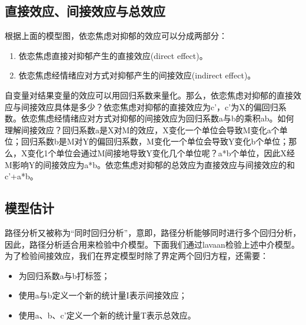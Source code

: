 \documentclass[
  chinese-hans,
  letterpaper,
  DIV=11,
  numbers=noendperiod]{scrartcl}
\providecommand{\tightlist}{%
  \setlength{\itemsep}{0pt}\setlength{\parskip}{0pt}}
\begin{document}
\subsection{直接效应、间接效应与总效应}\label{ux76f4ux63a5ux6548ux5e94ux95f4ux63a5ux6548ux5e94ux4e0eux603bux6548ux5e94}

根据上面的模型图，依恋焦虑对抑郁的效应可以分成两部分：

\begin{enumerate}
\def\labelenumi{\arabic{enumi}.}
\tightlist
\item
  依恋焦虑直接对抑郁产生的直接效应(direct effect)。
\item
  依恋焦虑经情绪应对方式对抑郁产生的间接效应(indirect effect)。
\end{enumerate}

自变量对结果变量的效应可以用回归系数来量化。那么，依恋焦虑对抑郁的直接效应与间接效应具体是多少？依恋焦虑对抑郁的直接效应为c'，c'为X的偏回归系数。依恋焦虑经情绪应对方式对抑郁的间接效应为回归系数a与b的乘积ab。如何理解间接效应？回归系数a是X对M的效应，X变化一个单位会导致M变化a个单位；回归系数b是M对Y的偏回归系数，M变化一个单位会导致Y变化b个单位；那么，X变化1个单位会通过M间接地导致Y变化几个单位呢？a*b个单位，因此X经M影响Y的间接效应为a*b。依恋焦虑对抑郁的总效应为直接效应与间接效应的和c'+a*b。

\subsection{模型估计}\label{ux6a21ux578bux4f30ux8ba1-1}

路径分析又被称为``同时回归分析''，意即，路径分析能够同时进行多个回归分析，因此，路径分析适合用来检验中介模型。下面我们通过lavaan检验上述中介模型。为了检验间接效应，我们在界定模型时除了界定两个回归方程，还需要：

\begin{itemize}
\tightlist
\item
  为回归系数a与b打标签；
\item
  使用a与b定义一个新的统计量I表示间接效应；
\item
  使用a、b、c'定义一个新的统计量T表示总效应。
\end{itemize}
\end{document}
